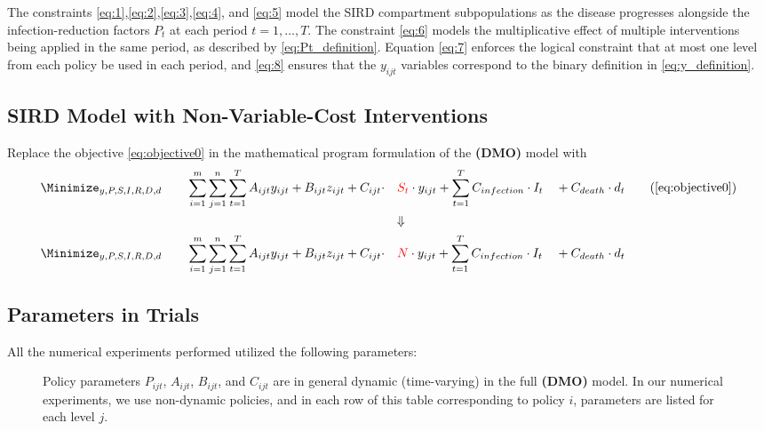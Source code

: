 \documentclass{article}
\newcommand{\model}{{\bf (DMO) }}
\begin{document}
The constraints \eqref{eq:1},\eqref{eq:2},\eqref{eq:3},\eqref{eq:4}, and \eqref{eq:5} model the SIRD compartment subpopulations as the disease progresses alongside the infection-reduction factors $P_t$ at each period $t=1,\ldots,T$. The constraint \eqref{eq:6} models the multiplicative effect of multiple interventions being applied in the same period, as described by \eqref{eq:Pt_definition}. Equation \eqref{eq:7} enforces the logical constraint that at most one level from each policy be used in each period, and \eqref{eq:8} ensures that the $y_{ijt}$ variables correspond to the binary definition in \eqref{eq:y_definition}.




\subsection{SIRD Model with Non-Variable-Cost Interventions}

Replace the objective \eqref{eq:objective0} in the mathematical program formulation of the \model model with
\begin{alignat}{3}
   & \Minimize_{y,P,S,I,R,D,d}\qquad \sum_{i=1}^{m}\sum_{j=1}^{n}\sum_{t=1}^{T}A_{ijt}y_{ijt} + B_{ijt}z_{ijt}+ C_{ijt}\cdot &&{\color{red}S_{t}} \cdot y_{ijt}+ \sum_{t=1}^{T}C_{infection}\cdot I_t &&+ C_{death} \cdot d_t \tag{\ref{eq:objective0}}\\
   & &&\mathbf{\Downarrow}\nonumber\\
   & \Minimize_{y,P,S,I,R,D,d}\qquad \sum_{i=1}^{m}\sum_{j=1}^{n}\sum_{t=1}^{T}A_{ijt}y_{ijt} + B_{ijt}z_{ijt}+ C_{ijt}\cdot &&{\color{red}N} \cdot y_{ijt}+ \sum_{t=1}^{T}C_{infection}\cdot I_t &&+ C_{death} \cdot d_t  \label{eq:obj_nonvariable}
\end{alignat}



\subsection{Parameters in Trials}\label{sec:params_table}

All the numerical experiments performed utilized the following parameters:

\begin{figure}[H]
        \begin{center}
        
        \end{center}
        \caption{Policy parameters $P_{ijt}$, $A_{ijt}$, $B_{ijt}$, and $C_{ijt}$ are in general dynamic (time-varying) in the full \model model. In our numerical experiments, we use non-dynamic policies, and in each row of this table corresponding to policy $i$, parameters are listed for each level $j$.}
        \label{table:params}
\end{figure}
\end{document}
